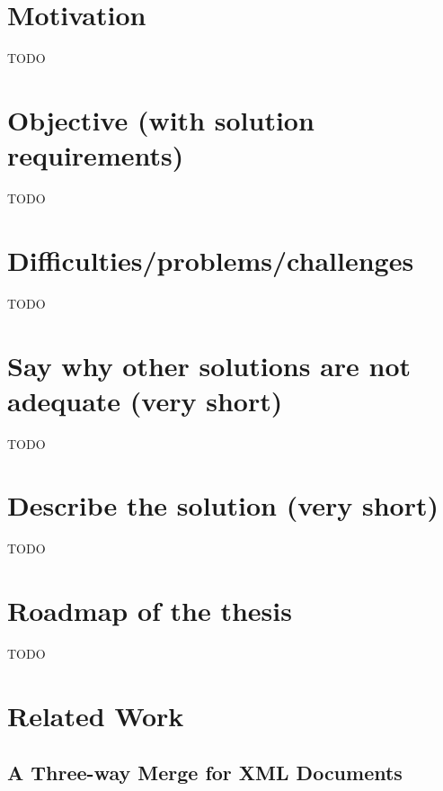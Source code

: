 \documentclass[a4paper,english]{ifimaster}
\begin{document}

\section{Motivation}
\label{sec:motivation}

TODO

\section{Objective (with solution requirements)}
\label{sec:objective_with_solution_requirements_}

TODO

\section{Difficulties/problems/challenges}
\label{sec:difficulties_problems_challenges}

TODO

\section{Say why other solutions are not adequate (very short)}
\label{sec:say_why_other_solutions_are_not_adequate_very_short_}

TODO

\section{Describe the solution (very short)}
\label{sec:describe_the_solution_very_short_}

TODO

\section{Roadmap of the thesis}
\label{sec:roadmap_of_the_thesis}

TODO

\section{Related Work}
\label{sec:related_work}

\subsection{A Three-way Merge for XML Documents}%
\label{sub:_a_three_way_merge_for_xml_documents}
\end{document}

